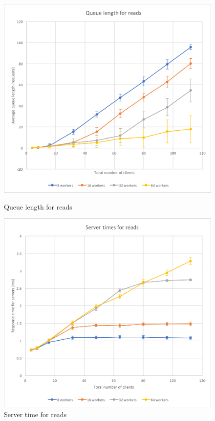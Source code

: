 \documentclass[11pt,a4paper]{article}
\begin{document}
\begin{figure}[!h]
    \centering
    \begin{minipage}[b]{.45\textwidth}
        \centering
        \includegraphics[width=\textwidth]{processing/graphics/bench_1mw_ql_reads.png}
        \caption{Queue length for reads}
        \label{png::bench_1mw_ql_reads}
    \end{minipage}
    \qquad
    \begin{minipage}[b]{.45\textwidth}
        \centering
        \includegraphics[width=\textwidth]{processing/graphics/bench_1mw_st_reads.png}
        \caption{Server time for reads}
        \label{png::bench_1mw_st_reads}
    \end{minipage}
\end{figure}
\end{document}
